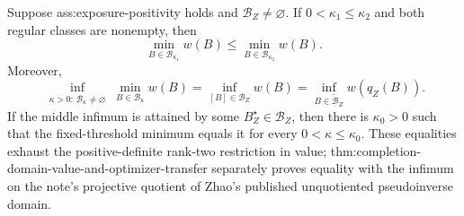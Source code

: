 Suppose ass:exposure-positivity holds and \(\mathcal B_Z\ne\varnothing\).  If \(0<\kappa_1\le\kappa_2\) and both regular classes are nonempty, then
\[
\min_{B\in\mathcal B_{\kappa_1}}w(B)
\le
\min_{B\in\mathcal B_{\kappa_2}}w(B).
\]
Moreover,
\[
\inf_{\substack{\kappa>0:\,\mathcal B_\kappa\ne\varnothing}}
\min_{B\in\mathcal B_\kappa}w(B)
=
\inf_{[B]\in\mathcal B_Z}w(B)
=
\inf_{B\in\widetilde{\mathcal B}_Z}w(q_Z(B)).
\]
If the middle infimum is attained by some \(B_Z^\star\in\mathcal B_Z\), then there is \(\kappa_0>0\) such that the fixed-threshold minimum equals it for every \(0<\kappa\le\kappa_0\).  These equalities exhaust the positive-definite rank-two restriction in value; thm:completion-domain-value-and-optimizer-transfer separately proves equality with the infimum on the note's projective quotient of Zhao's published unquotiented pseudoinverse domain.